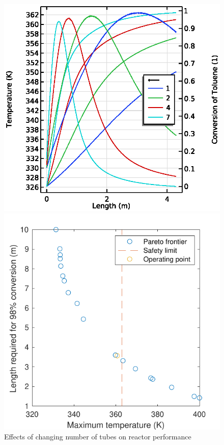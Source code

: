 \begin{figure}[h]
    \centering
    \begin{minipage}[t]{0.32\linewidth}
        \includegraphics[width=\linewidth]{figures/S5-T-X.eps}
        \caption{Effects of changing number of tubes on reactor performance}
        \label{fig:S5-T-X}
    \end{minipage}\hfill
    \begin{minipage}[t]{0.32\linewidth}
        \includegraphics[width=\linewidth]{figures/comsol-pareto.pdf}

\end{minipage}
\end{figure}
